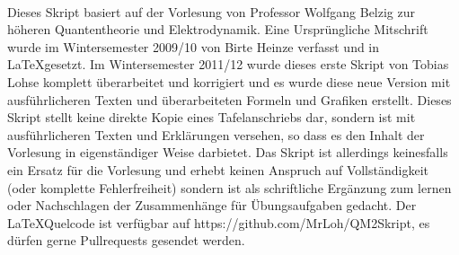 



\thispagestyle{empty} 
\maketitle
\thispagestyle{empty}
\newpage
\thispagestyle{empty}
$\;$
\newpage 
\thispagestyle{empty}
$\;$\vspace{3cm}
\par\begingroup\leftskip=3.5cm\rightskip=3.5cm
Dieses Skript basiert auf der Vorlesung von Professor Wolfgang Belzig zur höheren Quantentheorie und Elektrodynamik. Eine Ursprüngliche Mitschrift wurde im Wintersemester 2009/10 von Birte Heinze verfasst und in \LaTeX gesetzt. Im Wintersemester 2011/12 wurde dieses erste Skript von Tobias Lohse komplett überarbeitet und korrigiert und es wurde diese neue Version mit ausführlicheren Texten und überarbeiteten Formeln und Grafiken erstellt. Dieses Skript stellt keine direkte Kopie eines Tafelanschriebs dar, sondern ist mit ausführlicheren Texten und Erklärungen versehen, so dass es den Inhalt der Vorlesung in eigenständiger Weise darbietet. Das Skript ist allerdings keinesfalls ein Ersatz für die Vorlesung und erhebt keinen Anspruch auf Vollständigkeit (oder komplette Fehlerfreiheit) sondern ist als schriftliche Ergänzung zum lernen oder Nachschlagen der Zusammenhänge für Übungsaufgaben gedacht. Der \LaTeX Quelcode ist verfügbar auf https://github.com/MrLoh/QM2Skript, es dürfen gerne Pullrequests gesendet werden.
\par\endgroup 
\newpage 

\setcounter{page}{1}
\thispagestyle{plain}
\tableofcontents
\cleardoublepage 

\pagestyle{fancy}

